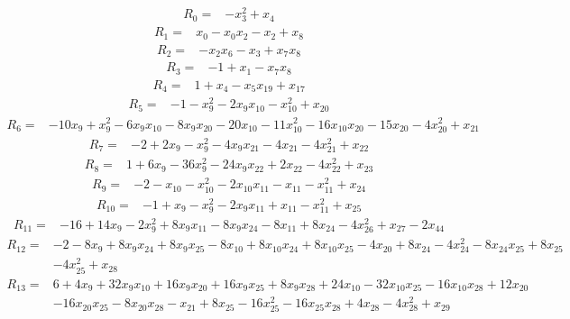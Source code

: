 \begin{align*}
 R_{0}={}&-x_{3}^{2} +x_{4}
\end{align*}
\begin{align*}
 R_{1}={}&x_{0} -x_{0}x_{2} -x_{2} +x_{8}
\end{align*}
\begin{align*}
 R_{2}={}&-x_{2}x_{6} -x_{3} +x_{7}x_{8}
\end{align*}
\begin{align*}
 R_{3}={}&-1 +x_{1} -x_{7}x_{8}
\end{align*}
\begin{align*}
 R_{4}={}&1 +x_{4} -x_{5}x_{19} +x_{17}
\end{align*}
\begin{align*}
 R_{5}={}&-1 -x_{9}^{2} -2x_{9}x_{10} -x_{10}^{2} +x_{20}
\end{align*}
\begin{align*}
 R_{6}={}&-10x_{9} +x_{9}^{2} -6x_{9}x_{10} -8x_{9}x_{20} -20x_{10} -11x_{10}^{2} -16x_{10}x_{20} -15x_{20} -4x_{20}^{2} +x_{21}
\end{align*}
\begin{align*}
 R_{7}={}&-2 +2x_{9} -x_{9}^{2} -4x_{9}x_{21} -4x_{21} -4x_{21}^{2} +x_{22}
\end{align*}
\begin{align*}
 R_{8}={}&1 +6x_{9} -36x_{9}^{2} -24x_{9}x_{22} +2x_{22} -4x_{22}^{2} +x_{23}
\end{align*}
\begin{align*}
 R_{9}={}&-2 -x_{10} -x_{10}^{2} -2x_{10}x_{11} -x_{11} -x_{11}^{2} +x_{24}
\end{align*}
\begin{align*}
 R_{10}={}&-1 +x_{9} -x_{9}^{2} -2x_{9}x_{11} +x_{11} -x_{11}^{2} +x_{25}
\end{align*}
\begin{align*}
 R_{11}={}&-16 +14x_{9} -2x_{9}^{2} +8x_{9}x_{11} -8x_{9}x_{24} -8x_{11} +8x_{24} -4x_{26}^{2} +x_{27} -2x_{44}
\end{align*}
\begin{align*}
 R_{12}={}&-2 -8x_{9} +8x_{9}x_{24} +8x_{9}x_{25} -8x_{10} +8x_{10}x_{24} +8x_{10}x_{25} -4x_{20} +8x_{24} -4x_{24}^{2} -8x_{24}x_{25} +8x_{25}\\
 &-4x_{25}^{2} +x_{28}
\end{align*}
\begin{align*}
 R_{13}={}&6 +4x_{9} +32x_{9}x_{10} +16x_{9}x_{20} +16x_{9}x_{25} +8x_{9}x_{28} +24x_{10} -32x_{10}x_{25} -16x_{10}x_{28} +12x_{20}\\
 &-16x_{20}x_{25} -8x_{20}x_{28} -x_{21} +8x_{25} -16x_{25}^{2} -16x_{25}x_{28} +4x_{28} -4x_{28}^{2} +x_{29}
\end{align*}
